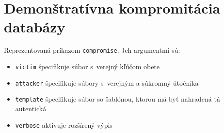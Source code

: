 \section{Demonštratívna kompromitácia databázy}
Reprezentovaná príkazom  \texttt{compromise}. Jeh argumentmi sú:
\begin{itemize}
    \item{\texttt{victim} špecifikuje súbor s~verejný kľúčom obete}
    \item{\texttt{attacker} špecifikuje súbory s~verejným a súkromný útočníka}
    \item{\texttt{template} špecifikuje súbor so šablónou, ktorou má byť nahradená tá autentická}
    \item{\texttt{verbose} aktivuje rozšírený výpis}
\end{itemize}